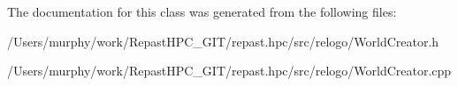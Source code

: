 The documentation for this class was generated from the following files\-:\begin{DoxyCompactItemize}
\item 
/\-Users/murphy/work/\-Repast\-H\-P\-C\-\_\-\-G\-I\-T/repast.\-hpc/src/relogo/World\-Creator.\-h\item 
/\-Users/murphy/work/\-Repast\-H\-P\-C\-\_\-\-G\-I\-T/repast.\-hpc/src/relogo/World\-Creator.\-cpp\end{DoxyCompactItemize}
